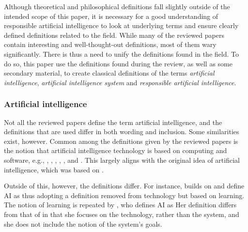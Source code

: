 \label{sec:Definitions}
Although theoretical and philosophical definitions fall slightly outside of the intended scope of this paper, it is necessary for a good understanding of responsible artificial intelligence to look at underlying terms and ensure clearly defined definitions related to the field. While many of the reviewed papers contain interesting and well-thought-out definitions, most of them wary significantly. There is thus a need to unify the definitions found in the field. To do so, this paper use the definitions found during the review, as well as some secondary material, to create classical definitions \parencite[p. 36]{Seppälä_2014} of the terms \textit{artificial intelligence}, \textit{artificial intelligence system} and \textit{responsible artificial intelligence}.


\subsubsection{Artificial intelligence}
\label{sec:definition-ai}
Not all the reviewed papers define the term artificial intelligence, and the definitions that are used differ in both wording and inclusion. Some similarities exist, however. Common among the definitions given by the reviewed papers is the notion that artificial intelligence technology is based on computing and software, e.g.,  \parencite[p. 1]{Siala_2022},  \parencite[p. 130]{Brand_2022},  \parencite[p. 2]{Dignum_2021},  \parencite[p. 1]{Havrda_2020},  \parencite[p. 3]{Liu_2021}, and  \parencite[p. 1]{Lukkien_2021}. This largely aligns with the original idea of artificial intelligence, which was based on  \parencite[p. 87]{Moor_2006}.

Outside of this, however, the definitions differ. For instance, \textcite[p. 258]{Mikalef_2022} builds on \textcite{Mikalef_2021_notreview} and define AI as  thus adopting a definition removed from technology but based on learning. The notion of learning is repeated by \textcite[p. 2]{Dignum_2021}, who defines AI as  Her definition differs from that of \citeauthor{Mikalef_2022} in that she focuses on the technology, rather than the system, and she does not include the notion of the system's goals.

